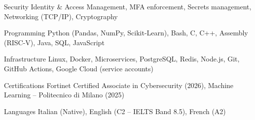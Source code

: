 

\begin{cvskills}

  \cvskill
    {Security} %
    {Identity \& Access Management, MFA enforcement, Secrets management, Networking (TCP/IP), Cryptography}

  \cvskill
    {Programming} %
    {Python (Pandas, NumPy, Scikit-Learn), Bash, C, C++, Assembly (RISC-V), Java, SQL, JavaScript}

  \cvskill
    {Infrastructure} %
    {Linux, Docker, Microservices, PostgreSQL, Redis, Node.js, Git, GitHub Actions, Google Cloud (service accounts)}

  \cvskill
    {Certifications} %
    {Fortinet Certified Associate in Cybersecurity (2026), Machine Learning -- Politecnico di Milano (2025)}

  \cvskill
    {Languages} %
    {Italian (Native), English (C2 -- IELTS Band 8.5), French (A2)} %
\end{cvskills}
